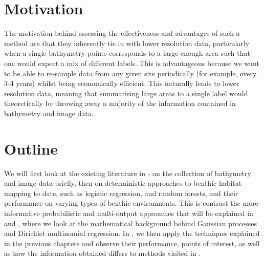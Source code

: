\section{Motivation}

 The motivation behind assessing the effectiveness and advantages of such a method are that they inherently tie in with lower resolution data, particularly when a single bathymetry points corresponds to a large enough area such that one would expect a mix of different labels. This is advantageous because we want to be able to re-sample data from any given site periodically (for example, every 3-4 years) whilst being economically efficient. This naturally lends to lower resolution data, meaning that summarising large areas to a single label would theoretically be throwing away a majority of the information contained in bathymetry and image data.

\section{Outline}

We will first look at the existing literature in  - on the collection of bathymetry and image data briefly, then on deterministic approaches to benthic habitat mapping to date, such as logistic regression, and random forests, and their performance on varying types of benthic environments. This is contrast the more informative probabilistic and multi-output approaches that will be explained in  and , where we look at the mathematical background behind Gaussian processes and Dirichlet multinomial regression. In , we then apply the techniques explained in the previous chapters and observe their performance, points of interest, as well as how the information obtained differs to methods visited in . 
